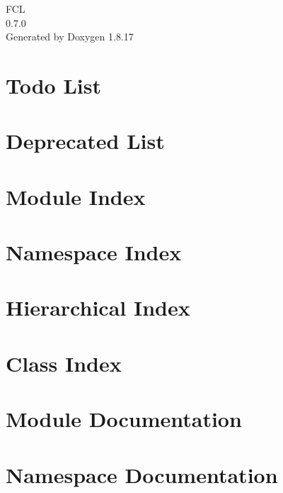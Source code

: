 \let\mypdfximage\pdfximage\def\pdfximage{\immediate\mypdfximage}\documentclass[twoside]{book}
\newcommand{\+}{\discretionary{\mbox{\scriptsize$\hookleftarrow$}}{}{}}
\newcommand{\clearemptydoublepage}{%
  \newpage{\pagestyle{empty}\cleardoublepage}%
}
\begin{document}
\hypersetup{pageanchor=false,
             bookmarksnumbered=true,
             pdfencoding=unicode
            }
\begin{titlepage}
\vspace*{7cm}
\begin{center}%
{\Large F\+CL \\[1ex]\large 0.\+7.\+0 }\\
\vspace*{1cm}
{\large Generated by Doxygen 1.8.17}\\
\end{center}
\end{titlepage}
\clearemptydoublepage
{}
\tableofcontents
\clearemptydoublepage
{}
\hypersetup{pageanchor=true}

\chapter{Todo List}
\label{todo}

\chapter{Deprecated List}
\label{deprecated}

\chapter{Module Index}

\chapter{Namespace Index}

\chapter{Hierarchical Index}

\chapter{Class Index}

\chapter{Module Documentation}

\chapter{Namespace Documentation}


\end{document}
